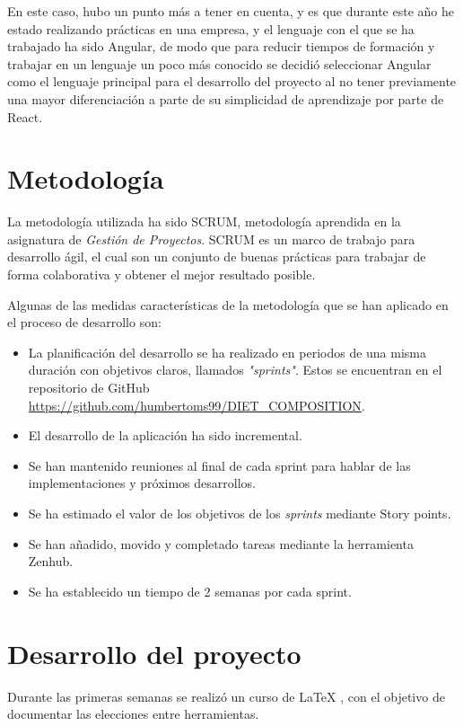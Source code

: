 En este caso, hubo un punto más a tener en cuenta, y es que durante este año he estado realizando prácticas en una empresa, y el lenguaje con el que se ha trabajado ha sido Angular, de modo que para reducir tiempos de formación y trabajar en un lenguaje un poco más conocido se decidió seleccionar Angular como el lenguaje principal para el desarrollo del proyecto al no tener previamente una mayor diferenciación a parte de su simplicidad de aprendizaje por parte de React.

\section{Metodología}

La metodología utilizada ha sido SCRUM, metodología aprendida en la asignatura de \emph{Gestión de Proyectos}. SCRUM es un marco de trabajo para desarrollo ágil, el cual son un conjunto de buenas prácticas para trabajar de forma colaborativa y obtener el mejor resultado  posible.

Algunas de las medidas características de la metodología que se han aplicado en el proceso de desarrollo son:

\begin{itemize}
	\item La  planificación del desarrollo se ha realizado en periodos de una misma duración con objetivos claros, llamados \emph{"sprints"}. Estos se encuentran en el repositorio de GitHub \url{https://github.com/humbertoms99/DIET_COMPOSITION}.
	\item El desarrollo  de la aplicación ha sido incremental.
	\item Se han mantenido reuniones al final de cada sprint para hablar de las implementaciones y próximos desarrollos. 
	\item Se ha estimado el valor de los objetivos de los \emph{sprints}  mediante Story points. 
	\item Se han añadido, movido y completado tareas mediante la herramienta Zenhub.
	\item Se ha establecido un tiempo de 2 semanas por cada sprint.
\end{itemize}

\section{Desarrollo del proyecto}

Durante las primeras semanas se realizó un curso de \LaTeX{} \cite{curso:latex}, con el objetivo de documentar las elecciones entre herramientas. 

